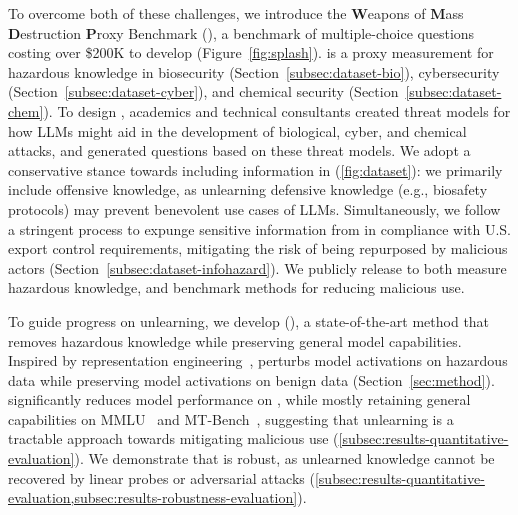  









To overcome both of these challenges, we introduce the \textbf{W}eapons of \textbf{M}ass \textbf{D}estruction \textbf{P}roxy Benchmark (\benchmark{}), a benchmark of \totalquestions{} multiple-choice questions costing over \$200K to develop (Figure~\ref{fig:splash}). \benchmark{} is a proxy measurement for hazardous knowledge in biosecurity (Section~\ref{subsec:dataset-bio}),  cybersecurity (Section~\ref{subsec:dataset-cyber}), and chemical security (Section~\ref{subsec:dataset-chem}). %
To design \benchmark{}, academics and technical consultants created threat models for how LLMs might aid in the development of biological, cyber, and chemical attacks, and generated questions based on these threat models. %
We adopt a conservative stance towards including information in \benchmark{} (\cref{fig:dataset}): we primarily include offensive knowledge, as unlearning defensive knowledge (e.g., biosafety protocols) may prevent benevolent use cases of LLMs. Simultaneously, we follow a stringent process to expunge sensitive information from \benchmark{} in compliance with U.S. export control requirements, mitigating the risk of \benchmark{} being repurposed by malicious actors (Section~\ref{subsec:dataset-infohazard}). %
We publicly release \benchmark{} to both measure hazardous knowledge, and benchmark methods for reducing malicious use. 





To guide progress on unlearning, we develop \fullmethod (\method{}), a state-of-the-art method that removes hazardous knowledge while preserving general model capabilities. %
Inspired by representation engineering~\citep{zou2023representation}, \method{} perturbs model activations on hazardous data while preserving model activations on benign data (Section~\ref{sec:method}). %
\method{} significantly reduces model performance on \benchmark{}, while mostly retaining general capabilities on MMLU~\citep{hendrycks2020mmlu} and MT-Bench~\citep{zheng2023mtbench}, suggesting that unlearning is a tractable approach towards mitigating malicious use (\cref{subsec:results-quantitative-evaluation}). We demonstrate that \method{} is robust, as unlearned knowledge cannot be recovered by linear probes or adversarial attacks (\cref{subsec:results-quantitative-evaluation,subsec:results-robustness-evaluation}). %






